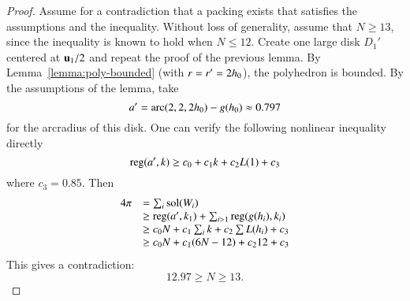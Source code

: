 \begin{proof}  Assume for a contradiction that a packing exists that satisfies the assumptions and the inequality.  Without loss of generality, assume that $N\ge 13$, since the inequality is known to hold when $N\le 12$.   Create one large disk $D_1'$ centered at $ {\mathbf u}_1/2$ and repeat the proof of the previous lemma.  By Lemma~\ref{lemma:poly-bounded} (with $r=r'=2{h_0}$), the polyhedron is bounded.  By the assumptions of the lemma, take 
$$a'=\operatorname{arc}(2,2,2{h_0})-g({h_0}) \approx 0.797$$
for the arcradius of this disk.  One can verify the following nonlinear inequality directly~\cite[]{hales:2009:nonlinear} %
$${\operatorname{reg}}(a',k) \ge c_0 + c_1 k + c_2 L(1) + c_3$$
where $c_3 = 0.85$.
Then 
$$
\begin{array}{lll}
4\pi &= \sum_i{\operatorname{sol}}(W_i)\\
     &\ge {\operatorname{reg}}(a',k_1)+\sum_{i>1} {\operatorname{reg}}(g(h_i),k_i) \\
     &\ge  c_0 N +c_1\sum_i k + c_2 \sum L(h_i) + c_3\\
     &\ge c_0 N +c_1 (6N-12) + c_2 12 + c_3\\
\end{array}
$$
This gives a contradiction:
$$
12.97 \ge N \ge 13.
$$
\end{proof}
